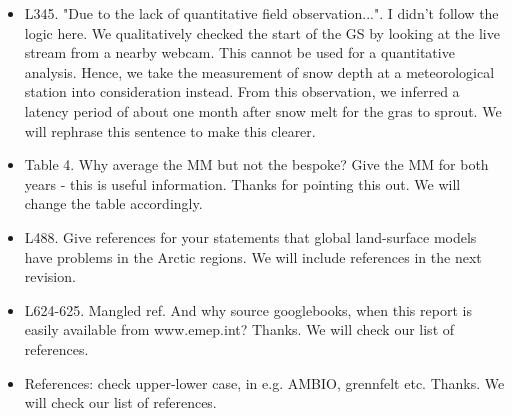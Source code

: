 \documentclass{scrartcl}
\begin{document}
\begin{itemize}
\item {\color{blue}L345. "Due to the lack of quantitative field observation...". I didn't follow the logic here.} We qualitatively checked the start of the GS by looking at the live stream from a nearby webcam. This cannot be used for a quantitative analysis. Hence, we take the measurement of snow depth at a meteorological station into consideration instead. From this observation, we inferred a latency period of about one month after snow melt for the gras to sprout. We will rephrase this sentence to make this clearer.

\item {\color{blue}Table 4. Why average the MM but not the bespoke? Give the MM for both years - this is useful information.}
Thanks for pointing this out. We will change the table accordingly.

\item {\color{blue}L488. Give references for your statements that global land-surface models have problems in the Arctic regions.}
We will include references in the next revision.

\item {\color{blue}L624-625. Mangled ref. And why source googlebooks, when this report is easily available from www.emep.int?}
Thanks. We will check our list of references.

\item {\color{blue}References: check upper-lower case, in e.g. AMBIO, grennfelt etc.}
Thanks. We will check our list of references.
 

\end{itemize}
\end{document}
